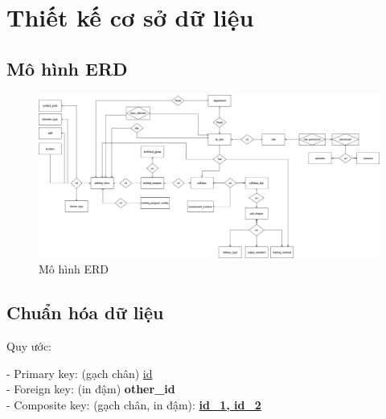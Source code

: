 \documentclass[report.tex]{subfiles}
\begin{document}
\section{Thiết kế cơ sở dữ liệu}

\subsection{Mô hình ERD}

\begin{figure}[!htb]
{\centering
\includegraphics[width=500px]{../meta/db.erd.png}
\caption{Mô hình ERD}
\par
}
\end{figure}
\FloatBarrier

\subsection{Chuẩn hóa dữ liệu}

Quy ước:

- Primary key: (gạch chân) \underline{id} \\
- Foreign key: (in đậm) \textbf{other\_id} \\
- Composite key: (gạch chân, in đậm): \textbf{\underline{id\_1, id\_2}} \\
\end{document}
